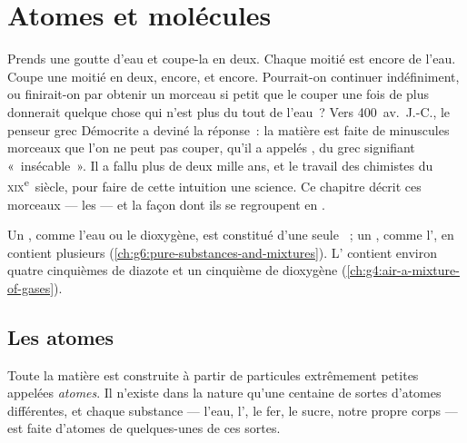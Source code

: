 \chapter{Atomes et molécules}\label{ch:g7:atoms-and-molecules}

Prends une goutte d'eau et coupe-la en deux. Chaque moitié est encore
de l'eau. Coupe une moitié en deux, encore, et encore. Pourrait-on
continuer indéfiniment, ou finirait-on par obtenir un morceau si petit
que le couper une fois de plus donnerait quelque chose qui n'est plus du
tout de l'eau~? Vers 400~av.~J.-C., le penseur grec Démocrite a deviné
la réponse~: la matière est faite de minuscules morceaux que l'on ne
peut pas couper, qu'il a appelés \emph{}, du grec signifiant
«~insécable~». Il a fallu plus de deux mille ans, et le travail des
chimistes du \textsc{xix}\textsuperscript{e}~siècle, pour faire de
cette intuition une science. Ce chapitre décrit ces morceaux --- les
 --- et la façon dont ils se regroupent en .

\begin{recall}
Un , comme l'eau ou le dioxygène, est constitué d'une seule
~; un , comme l', en contient plusieurs
(\cref{ch:g6:pure-substances-and-mixtures}). L' contient environ
quatre cinquièmes de diazote et un cinquième de dioxygène
(\cref{ch:g4:air-a-mixture-of-gases}).
\end{recall}

\section{Les atomes}

\begin{definition}[Atome]\label{def:g7:atoms-and-molecules:atom}
Toute la matière est construite à partir de particules extrêmement
petites appelées \emph{atomes}. Il n'existe dans la nature
qu'une centaine de sortes d'atomes différentes, et chaque substance ---
l'eau, l', le fer, le sucre, notre propre corps --- est faite
d'atomes de quelques-unes de ces sortes.
\end{definition}

